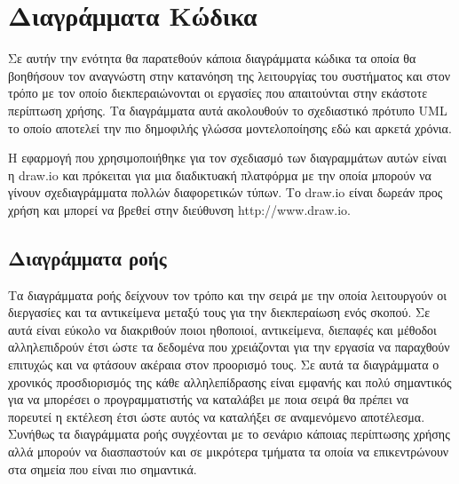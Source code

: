 \section{Διαγράμματα Κώδικα}
Σε αυτήν την ενότητα θα παρατεθούν κάποια διαγράμματα κώδικα τα οποία θα βοηθήσουν τον αναγνώστη στην κατανόηση της λειτουργίας του συστήματος και στον τρόπο με τον οποίο διεκπεραιώνονται οι εργασίες που απαιτούνται στην εκάστοτε περίπτωση χρήσης. Τα διαγράμματα αυτά ακολουθούν το σχεδιαστικό πρότυπο UML το οποίο αποτελεί την πιο δημοφιλής γλώσσα μοντελοποίησης εδώ και αρκετά χρόνια.

Η εφαρμογή που χρησιμοποιήθηκε για τον σχεδιασμό των διαγραμμάτων αυτών είναι η draw.io και πρόκειται για μια διαδικτυακή πλατφόρμα με την οποία μπορούν να γίνουν σχεδιαγράμματα πολλών διαφορετικών τύπων. Το draw.io είναι δωρεάν προς χρήση και μπορεί να βρεθεί στην διεύθυνση http://www.draw.io.

\subsection{Διαγράμματα ροής}
Τα διαγράμματα ροής δείχνουν τον τρόπο και την σειρά με την οποία λειτουργούν οι διεργασίες και τα αντικείμενα μεταξύ τους για την διεκπεραίωση ενός σκοπού. Σε αυτά είναι εύκολο να διακριθούν ποιοι ηθοποιοί, αντικείμενα, διεπαφές και μέθοδοι αλληλεπιδρούν έτσι ώστε τα δεδομένα που χρειάζονται για την εργασία να παραχθούν επιτυχώς και να φτάσουν ακέραια στον προορισμό τους. Σε αυτά τα διαγράμματα ο χρονικός προσδιορισμός της κάθε αλληλεπίδρασης είναι εμφανής και πολύ σημαντικός για να μπορέσει ο προγραμματιστής να καταλάβει με ποια σειρά θα πρέπει να πορευτεί η εκτέλεση έτσι ώστε αυτός να καταλήξει σε αναμενόμενο αποτέλεσμα. Συνήθως τα διαγράμματα ροής συγχέονται με το σενάριο κάποιας περίπτωσης χρήσης αλλά μπορούν να διασπαστούν και σε μικρότερα τμήματα τα οποία να επικεντρώνουν στα σημεία που είναι πιο σημαντικά. 

